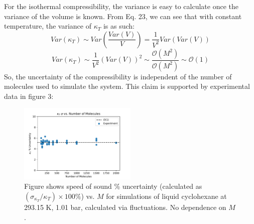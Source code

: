 \documentclass[9pt,bestpractices]{livecoms}
\begin{document}
For the isothermal compressibility, the variance is easy to calculate once the variance of the volume is known.  From Eq. 23, we can see that with constant temperature, the variance of $\kappa_T$ is as such:
\begin{equation}
Var(\kappa_T) \sim Var \left( \frac{Var(V)}{V}\right) = \frac{1}{V^2}Var(Var(V))
\end{equation}
\begin{equation}
Var(\kappa_T) \sim \frac{1}{V^2} (Var(V))^2 \sim \frac{\mathcal{O}(M^2)}{\mathcal{O}(M^2)} \sim \mathcal{O}(1)
\end{equation}
So, the uncertainty of the compressibility is independent of the number of molecules used to simulate the system.  This claim is supported by experimental data in figure 3:  
\begin{figure}[H]
\includegraphics[width=0.5\textwidth]{kt_stdev_vs_number_of_molecules.pdf}
\caption{Figure shows speed of sound \% uncertainty (calculated as $(\sigma_{\kappa_T}/\kappa_T) \times 100 \%$) vs. $M$ for simulations of liquid cyclohexane at 293.15 K, 1.01 bar, calculated via fluctuations. No dependence on $M$.}
\end{figure}
\end{document}
